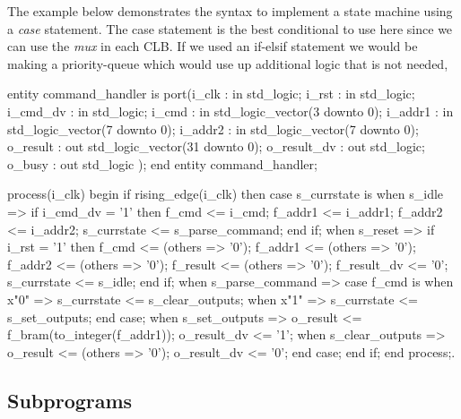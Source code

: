 The example below demonstrates the syntax to implement a state machine using a \emph{case} statement. The case statement is the best conditional to use here since we can use the \emph{mux} in each \ac{CLB}. If we used an if-elsif statement we would be making a priority-queue which would use up additional logic that is not needed,

\begin{VHDLlisting}[tabsize=4]
entity command_handler is
port(i_clk       : in    std_logic;
     i_rst       : in    std_logic;
     i_cmd_dv    : in    std_logic;
     i_cmd       : in    std_logic_vector(3 downto 0);
     i_addr1     : in    std_logic_vector(7 downto 0);
     i_addr2     : in    std_logic_vector(7 downto 0);
     o_result    :   out std_logic_vector(31 downto 0);
     o_result_dv :   out std_logic;
     o_busy      :   out std_logic
);
end entity command_handler;
\end{VHDLlisting}


\begin{VHDLlisting}[tabsize=4]
process(i_clk)
begin
    if rising_edge(i_clk) then
        case s_currstate is
            when s_idle => 
                if i_cmd_dv = '1' then
                    f_cmd    <= i_cmd;
                    f_addr1  <= i_addr1;
                    f_addr2  <= i_addr2;
                    s_currstate <= s_parse_command;
                end if;
            when s_reset => 
                if i_rst = '1' then
                    f_cmd <= (others => '0');
                    f_addr1 <= (others => '0');
                    f_addr2 <= (others => '0');
                    f_result <= (others => '0');
                    f_result_dv <= '0';
                    s_currstate <= s_idle;
                end if;
            when s_parse_command => 
                case f_cmd is 
                    when x"0" => 
                        s_currstate <= s_clear_outputs;
                    when x"1" => 
                        s_currstate <= s_set_outputs;
  	            end case;
            when s_set_outputs => 
                o_result <= f_bram(to_integer(f_addr1));
                o_result_dv <= '1';
            when s_clear_outputs => 
                o_result <= (others => '0');
                o_result_dv <= '0';
        end case;
    end if;
end process;.
\end{VHDLlisting}
 

\subsection{Subprograms}

